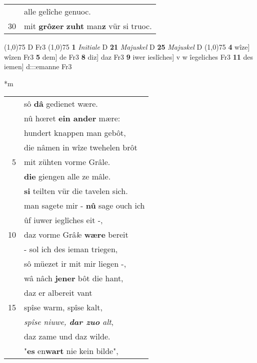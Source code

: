 \documentclass[8pt,a4paper,notitlepage]{article}
\begin{document}
\begin{table}[ht]
\begin{minipage}[t]{0.5\linewidth}
\begin{tabular}{rl}
 & alle gelîche genuoc.\\ 
30 & mit \textbf{grôzer} \textbf{zuht} man\textbf{z} vür si truoc.\\ 
\end{tabular}
\scriptsize
\line(1,0){75} \newline
D Fr3 \newline
\line(1,0){75} \newline
\textbf{1} \textit{Initiale} D  \textbf{21} \textit{Majuskel} D  \textbf{25} \textit{Majuskel} D  \newline
\line(1,0){75} \newline
\textbf{4} wîze] wîzen Fr3 \textbf{5} dem] de Fr3 \textbf{8} diz] daz Fr3 \textbf{9} iwer ieslîches] v w îegeliches Fr3 \textbf{11} des iemen] d:::emanne Fr3 \newline
\end{minipage}
\hspace{0.5cm}
\begin{minipage}[t]{0.5\linewidth}
\small
\begin{center}*m
\end{center}
\begin{tabular}{rl}
 & sô \textbf{dâ} gedienet wære.\\ 
 & nû hœret \textbf{ein ander} mære:\\ 
 & hundert knappen man gebôt,\\ 
 & die nâmen in wîze twehelen brôt\\ 
5 & mit zühten vorme Grâle.\\ 
 & \textbf{die} giengen alle ze mâle.\\ 
 & \textbf{si} teilten vür die tavelen sich.\\ 
 & man sagete mir - \textbf{nû} sage ouch ich\\ 
 & ûf iuwer ieglîches eit -,\\ 
10 & daz vorme Grâ\textit{l}e \textbf{wære} bereit\\ 
 & - sol ich des ieman triegen,\\ 
 & sô müezet ir mit mir liegen -,\\ 
 & wâ nâch \textbf{jener} bôt die hant,\\ 
 & daz er albereit vant\\ 
15 & spîse warm, spîse kalt,\\ 
 & \textit{spîse niuwe, \textbf{dar zuo} alt},\\ 
 & daz zame und daz wilde.\\ 
 & "\textbf{es} en\textbf{wart} nie kein bilde",\\ 

\end{tabular}
\end{minipage}
\end{table}
\end{document}

